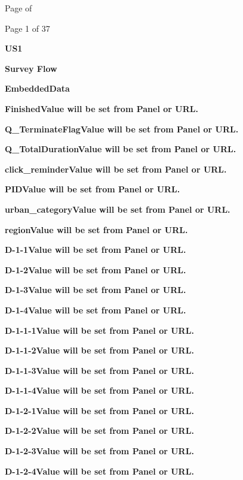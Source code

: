 \documentclass{article} %
\begin{document}


\noindent 

\noindent 

\noindent 

\noindent 

\noindent Page of 

\noindent 

\noindent Page 1 of 37

\noindent 

\noindent \textbf{US1}

\noindent 

\noindent \textbf{Survey Flow}

\noindent \textbf{EmbeddedData}

\textbf{FinishedValue will be set from Panel or URL.}

\textbf{Q\_TerminateFlagValue will be set from Panel or URL.}

\textbf{Q\_TotalDurationValue will be set from Panel or URL.}

\textbf{click\_reminderValue will be set from Panel or URL.}

\textbf{PIDValue will be set from Panel or URL.}

\textbf{urban\_categoryValue will be set from Panel or URL.}

\textbf{regionValue will be set from Panel or URL.}

\textbf{D-1-1Value will be set from Panel or URL.}

\textbf{D-1-2Value will be set from Panel or URL.}

\textbf{D-1-3Value will be set from Panel or URL.}

\textbf{D-1-4Value will be set from Panel or URL.}

\textbf{D-1-1-1Value will be set from Panel or URL.}

\textbf{D-1-1-2Value will be set from Panel or URL.}

\textbf{D-1-1-3Value will be set from Panel or URL.}

\textbf{D-1-1-4Value will be set from Panel or URL.}

\textbf{D-1-2-1Value will be set from Panel or URL.}

\textbf{D-1-2-2Value will be set from Panel or URL.}

\textbf{D-1-2-3Value will be set from Panel or URL.}

\textbf{D-1-2-4Value will be set from Panel or URL.}
\end{document}
